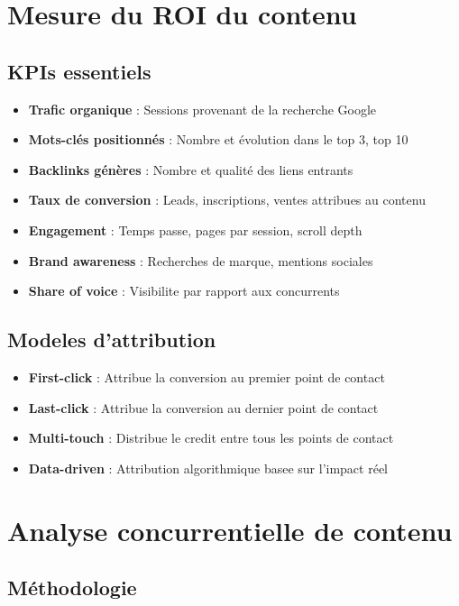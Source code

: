 \documentclass[12pt,a4paper,twoside]{report}
\begin{document}
\section{Mesure du ROI du contenu}

\subsection{KPIs essentiels}

\begin{itemize}
    \item \textbf{Trafic organique} : Sessions provenant de la recherche Google
    \item \textbf{Mots-clés positionnés} : Nombre et évolution dans le top 3, top 10
    \item \textbf{Backlinks génères} : Nombre et qualité des liens entrants
    \item \textbf{Taux de conversion} : Leads, inscriptions, ventes attribues au contenu
    \item \textbf{Engagement} : Temps passe, pages par session, scroll depth
    \item \textbf{Brand awareness} : Recherches de marque, mentions sociales
    \item \textbf{Share of voice} : Visibilite par rapport aux concurrents
\end{itemize}

\subsection{Modeles d'attribution}

\begin{itemize}
    \item \textbf{First-click} : Attribue la conversion au premier point de contact
    \item \textbf{Last-click} : Attribue la conversion au dernier point de contact
    \item \textbf{Multi-touch} : Distribue le credit entre tous les points de contact
    \item \textbf{Data-driven} : Attribution algorithmique basee sur l'impact réel
\end{itemize}

\section{Analyse concurrentielle de contenu}

\subsection{Méthodologie}
\end{document}
